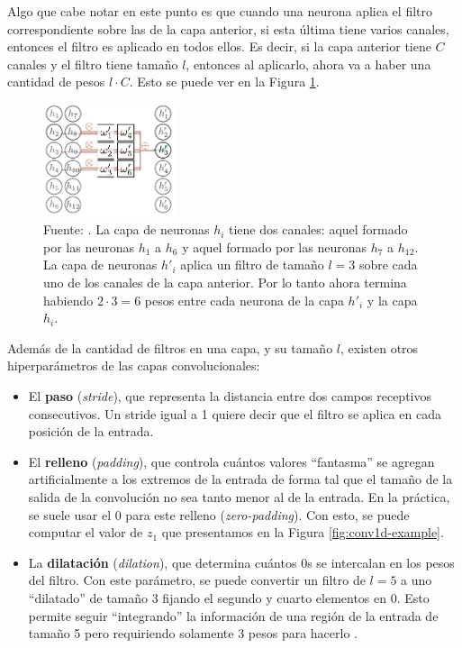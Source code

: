 \documentclass[../../main.tex]{subfiles}
\begin{document}
Algo que cabe notar en este punto es que cuando una neurona aplica el filtro
correspondiente sobre las de la capa anterior, si esta última tiene varios canales,
entonces el filtro es aplicado en todos ellos. Es decir, si la capa anterior tiene \(C\)
canales y el filtro tiene tamaño \(l\), entonces al aplicarlo, ahora va a haber una
cantidad de pesos \(l \cdot C\). Esto se puede ver en la Figura
\ref{fig:conv-layer-multi-channel}.

\begin{figure}
    \centering
    \includegraphics[width=0.35\textwidth]{figs/conv-layer-multi-channel.png}
    \caption{Fuente: \cite{prince2024understanding}. La capa de neuronas \(h_i\) tiene
    dos canales: aquel formado por las neuronas \(h_1\) a \(h_6\) y aquel formado
    por las neuronas \(h_7\) a \(h_{12}\). La capa de neuronas \(h'_i\) aplica un
    filtro de tamaño \(l=3\) sobre cada uno de los canales de la capa anterior. Por
    lo tanto ahora termina habiendo \(2 \cdot 3 = 6\) pesos entre cada neurona de la
    capa \(h'_i\) y la capa \(h_i\).}
    \label{fig:conv-layer-multi-channel}
\end{figure}

Además de la cantidad de filtros en una capa, y su tamaño \(l\), existen otros
hiperparámetros de las capas convolucionales: \vspace{-0.25cm}
\begin{itemize}[noitemsep]
    \item El \textbf{paso} (\textit{stride}), que representa la distancia entre dos campos receptivos
    consecutivos. Un stride igual a 1 quiere decir que el filtro se aplica en cada
    posición de la entrada.
    \item El \textbf{relleno} (\textit{padding}), que controla cuántos valores
    ``fantasma'' se agregan artificialmente a los extremos de la entrada de forma tal que
    el tamaño de la salida de la convolución no sea tanto menor al de la entrada. En la
    práctica, se suele usar el 0 para este relleno (\textit{zero-padding}). Con esto, se
    puede computar el valor de \(z_1\) que presentamos en la Figura
    \ref{fig:conv1d-example}.
    \item La \textbf{dilatación} (\textit{dilation}), que determina cuántos 0s se
    intercalan en los pesos del filtro. Con este parámetro, se puede convertir un filtro
    de \(l=5\) a uno ``dilatado'' de tamaño 3 fijando el segundo y cuarto elementos en 0.
    Esto permite seguir ``integrando'' la información de una región de la entrada de
    tamaño 5 pero requiriendo solamente 3 pesos para hacerlo
    \cite{prince2024understanding}.
\end{itemize}
\end{document}

